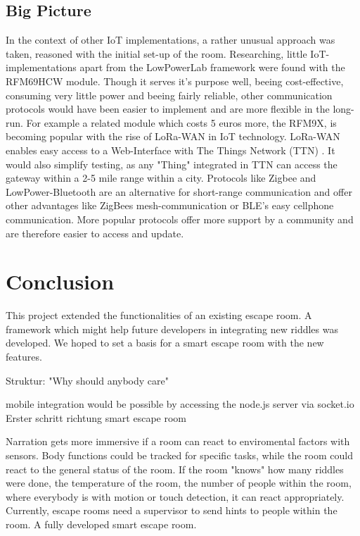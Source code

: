 \subsection{Big Picture}

In the context of other IoT implementations, a rather unusual approach was taken, reasoned with the initial set-up of the room.
Researching, little IoT-implementations apart from the LowPowerLab framework were found with the RFM69HCW module. 
Though it serves it's purpose well, beeing cost-effective, consuming very little power and beeing fairly reliable,
other communication protocols would have been easier to implement and are more flexible in the long-run.
For example a related module which costs 5 euros more, the RFM9X, is becoming popular with the rise of LoRa-WAN in IoT technology. 
LoRa-WAN enables easy access to a Web-Interface with The Things Network (TTN) \parencite{TTN}.
It would also simplify testing, as any "Thing" integrated in TTN can access the gateway within a 2-5 mile range within a city. 
Protocols like Zigbee and LowPower-Bluetooth are an alternative for short-range communication and offer other 
advantages like ZigBees mesh-communication or BLE's easy cellphone communication.
More popular protocols offer more support by a community and are therefore easier to access and update.

\section{Conclusion}
This project extended the functionalities of an existing escape room.
A framework which might help future developers in integrating new riddles was developed.
We hoped to set a basis for a smart escape room with the new features.


Struktur:
"Why should anybody care"


mobile integration would be possible by accessing the node.js server via socket.io
Erster schritt richtung smart escape room

Narration gets more immersive if a room can react to enviromental factors with sensors. 
Body functions could be tracked for specific tasks, while the room could react to the general status of the room. 
If the room "knows" how many riddles were done, the temperature of the room, 
the number of people within the room, where everybody is with motion or touch detection, it can react appropriately.
Currently, escape rooms need a supervisor to send hints to people within the room. 
A fully developed smart escape room.

